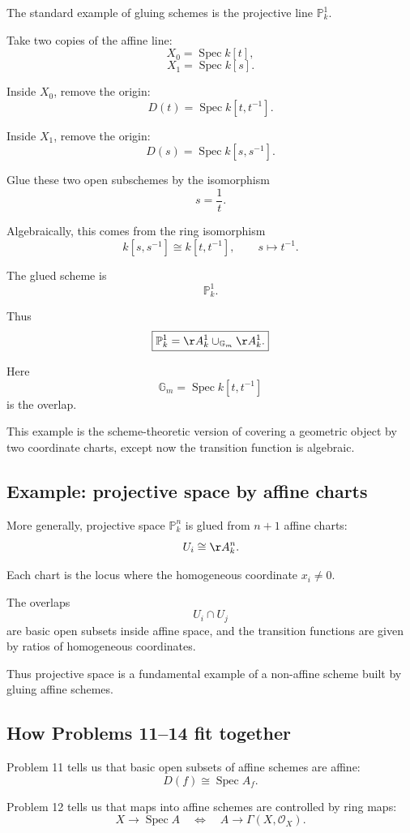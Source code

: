 \documentclass[12pt,a4paper]{article}
\newcommand{\GG}{\mathbb G}
\newcommand{\PP}{\mathbb P}
\newcommand{\OO}{\mathcal{O}}
\newcommand{\Spec}{\operatorname{Spec}}
\theoremstyle{notespace}
\begin{document}
The standard example of gluing schemes is the projective line \(\PP^1_k\).

Take two copies of the affine line:
\[
X_0=\Spec k[t],
\]
\[
X_1=\Spec k[s].
\]

Inside \(X_0\), remove the origin:
\[
D(t)=\Spec k[t,t^{-1}].
\]

Inside \(X_1\), remove the origin:
\[
D(s)=\Spec k[s,s^{-1}].
\]

Glue these two open subschemes by the isomorphism
\[
s=\frac1t.
\]

Algebraically, this comes from the ring isomorphism
\[
k[s,s^{-1}]
\cong
k[t,t^{-1}],
\qquad
s\mapsto t^{-1}.
\]

The glued scheme is
\[
\PP^1_k.
\]

Thus
\[
\boxed{
	\PP^1_k
	=
	\AA^1_k
	\cup_{\GG_m}
	\AA^1_k.
}
\]

Here
\[
\GG_m=\Spec k[t,t^{-1}]
\]
is the overlap.

This example is the scheme-theoretic version of covering a geometric object by two coordinate charts, except now the transition function is algebraic.

\subsection{Example: projective space by affine charts}

More generally, projective space \(\PP^n_k\) is glued from \(n+1\) affine charts:
\[
U_i\cong\AA^n_k.
\]

Each chart is the locus where the homogeneous coordinate \(x_i\neq 0\).

The overlaps
\[
U_i\cap U_j
\]
are basic open subsets inside affine space, and the transition functions are given by ratios of homogeneous coordinates.

Thus projective space is a fundamental example of a non-affine scheme built by gluing affine schemes.

\subsection{How Problems 11--14 fit together}

Problem 11 tells us that basic open subsets of affine schemes are affine:
\[
D(f)\cong\Spec A_f.
\]

Problem 12 tells us that maps into affine schemes are controlled by ring maps:
\[
X\to\Spec A
\quad\Longleftrightarrow\quad
A\to\Gamma(X,\OO_X).
\]
\end{document}
